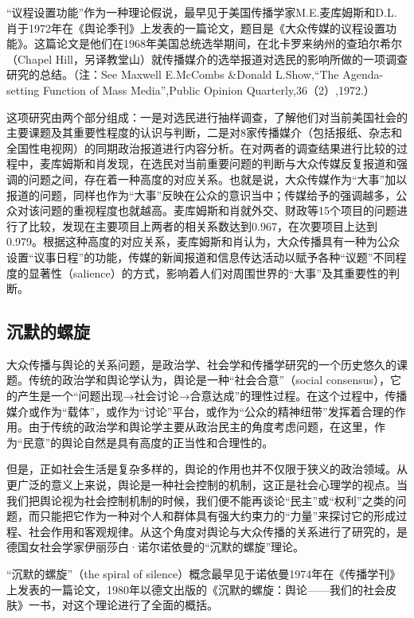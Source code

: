 \documentclass[UTF8,12pt]{ctexart}
\numberwithin{equation}{section} %
\numberwithin{figure}{section}
\numberwithin{table}{section}
\begin{document}
	“议程设置功能”作为一种理论假说，最早见于美国传播学家M.E.麦库姆斯和D.L.肖于1972年在《舆论季刊》上发表的一篇论文，题目是《大众传媒的议程设置功能》。这篇论文是他们在1968年美国总统选举期间，在北卡罗来纳州的查珀尔希尔（Chapel Hill，另译教堂山）就传播媒介的选举报道对选民的影响所做的一项调查研究的总结。（注：See Maxwell E.McCombs \&Donald L.Show,“The Agenda-setting Function of Mass Media”,Public Opinion Quarterly,36（2）,1972.）
	
	这项研究由两个部分组成：一是对选民进行抽样调查，了解他们对当前美国社会的主要课题及其重要性程度的认识与判断，二是对8家传播媒介（包括报纸、杂志和全国性电视网）的同期政治报道进行内容分析。在对两者的调查结果进行比较的过程中，麦库姆斯和肖发现，在选民对当前重要问题的判断与大众传媒反复报道和强调的问题之间，存在着一种高度的对应关系。也就是说，大众传媒作为“大事”加以报道的问题，同样也作为“大事”反映在公众的意识当中；传媒给予的强调越多，公众对该问题的重视程度也就越高。麦库姆斯和肖就外交、财政等15个项目的问题进行了比较，发现在主要项目上两者的相关系数达到0.967，在次要项目上达到0.979。根据这种高度的对应关系，麦库姆斯和肖认为，大众传播具有一种为公众设置“议事日程”的功能，传媒的新闻报道和信息传达活动以赋予各种“议题”不同程度的显著性（salience）的方式，影响着人们对周围世界的“大事”及其重要性的判断。
	
	\subsection{沉默的螺旋}
	大众传播与舆论的关系问题，是政治学、社会学和传播学研究的一个历史悠久的课题。传统的政治学和舆论学认为，舆论是一种“社会合意”（social consensus），它的产生是一个“问题出现→社会讨论→合意达成”的理性过程。在这个过程中，传播媒介或作为“载体”，或作为“讨论”平台，或作为“公众的精神纽带”发挥着合理的作用。由于传统的政治学和舆论学主要从政治民主的角度考虑问题，在这里，作为“民意”的舆论自然是具有高度的正当性和合理性的。
	
	但是，正如社会生活是复杂多样的，舆论的作用也并不仅限于狭义的政治领域。从更广泛的意义上来说，舆论是一种社会控制的机制，这正是社会心理学的视点。当我们把舆论视为社会控制机制的时候，我们便不能再谈论“民主”或“权利”之类的问题，而只能把它作为一种对个人和群体具有强大约束力的“力量”来探讨它的形成过程、社会作用和客观规律。从这个角度对舆论与大众传播的关系进行了研究的，是德国女社会学家伊丽莎白·诺尔诺依曼的“沉默的螺旋”理论。
	
	“沉默的螺旋”（the spiral of silence）概念最早见于诺依曼1974年在《传播学刊》上发表的一篇论文，1980年以德文出版的《沉默的螺旋：舆论——我们的社会皮肤》一书，对这个理论进行了全面的概括。
	
\end{document}
